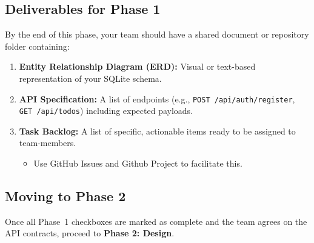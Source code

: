 \subsection{Deliverables for Phase 1}
By the end of this phase, your team should have a shared document or repository folder containing:
\begin{enumerate}
  \item \textbf{Entity Relationship Diagram (ERD):} Visual or text-based representation of your SQLite schema.
  \item \textbf{API Specification:} A list of endpoints (e.g., \texttt{POST /api/auth/register}, \texttt{GET /api/todos}) including expected payloads.
  \item \textbf{Task Backlog:} A list of specific, actionable items ready to be assigned to team-members.
  \begin{itemize}
    \item Use GitHub Issues and Github Project to facilitate this.
  \end{itemize}
\end{enumerate}

\subsection{Moving to Phase 2}
Once all Phase~1 checkboxes are marked as complete and the team agrees on the API contracts,
proceed to \textbf{Phase 2: Design}.
